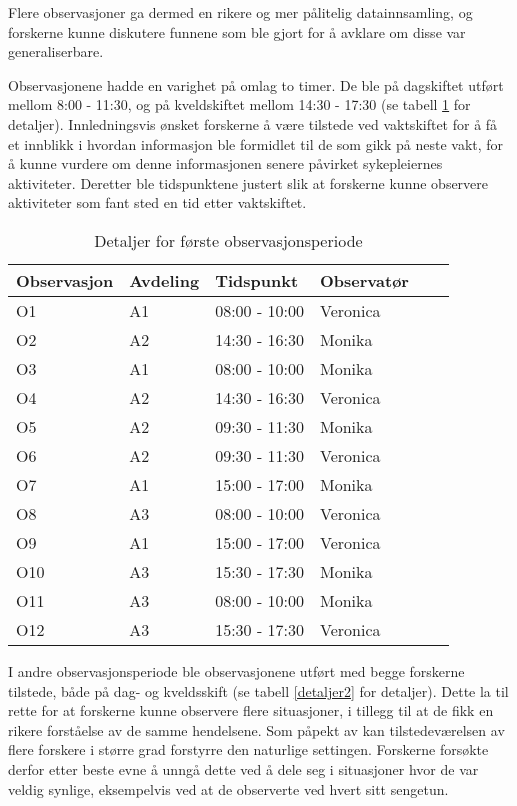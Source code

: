 \noindent
Flere observasjoner ga dermed en rikere og mer pålitelig datainnsamling, og forskerne kunne diskutere funnene som ble gjort for å avklare om disse var generaliserbare.

\noindent
Observasjonene hadde en varighet på omlag to timer. De ble på dagskiftet utført mellom 8:00 - 11:30, og på kveldskiftet mellom 14:30 - 17:30 (se tabell \ref{detaljer1} for detaljer).
Innledningsvis ønsket forskerne å være tilstede ved vaktskiftet for å få et innblikk i hvordan informasjon ble formidlet til de som gikk på neste vakt, for å kunne vurdere om denne informasjonen senere påvirket sykepleiernes aktiviteter. Deretter ble tidspunktene justert slik at forskerne kunne observere aktiviteter som fant sted en tid etter vaktskiftet.
 
\begin{table}[H]\centering
    \begin{tabular}{ |l|l|l|l|l|l| }
    \hline
    Observasjon & Avdeling & Tidspunkt & Observatør \\ \hline
       O1 & A1 & 08:00 - 10:00 & Veronica \\ \hline
       O2 & A2 & 14:30 - 16:30 & Monika \\ \hline
      O3 & A1 & 08:00 - 10:00 & Monika \\ \hline
       O4 & A2 & 14:30 - 16:30 & Veronica \\ \hline
         O5 & A2 & 09:30 - 11:30 & Monika \\ \hline
       O6 & A2 & 09:30 - 11:30 & Veronica \\ \hline
      O7 & A1 & 15:00 - 17:00 & Monika \\ \hline
       O8 & A3 & 08:00 - 10:00 & Veronica \\ \hline
       O9 & A1 & 15:00 - 17:00 & Veronica \\ \hline
       O10 & A3 & 15:30 - 17:30 & Monika \\ \hline
      O11 & A3 & 08:00 - 10:00 & Monika \\ \hline
       O12 & A3 & 15:30 - 17:30 & Veronica \\ \hline
    \end{tabular}
    \caption {Detaljer for første observasjonsperiode}
    \label{detaljer1}
\end{table}
 
\noindent
I andre observasjonsperiode ble observasjonene utført med begge forskerne tilstede, både på dag- og kveldsskift (se tabell \ref{detaljer2} for detaljer). Dette la til rette for at forskerne kunne observere flere situasjoner, i tillegg til at de fikk en rikere forståelse av de samme hendelsene. Som påpekt av \citet{Millen00} kan tilstedeværelsen av flere forskere i større grad forstyrre den naturlige settingen. Forskerne forsøkte derfor etter beste evne å unngå dette ved å dele seg i situasjoner hvor de var veldig synlige, eksempelvis ved at de observerte ved hvert sitt sengetun.
 
